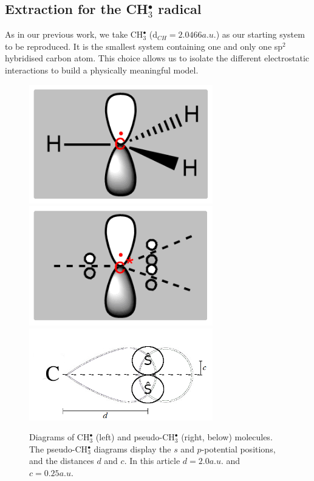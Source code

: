 \documentclass[aip]{revtex4-1}
\begin{document}
\subsection{Extraction for the CH$_3^\bullet$ radical}
\label{section:potential_derivation}
As in our previous work\cite{drujon_pseudopotentials_2013},
we take CH\(^{\bullet}_{3}\) (d$_{CH}=2.0466 a.u.$) as our starting system to be reproduced.
It is the smallest system containing one and only one sp$^2$ hybridised carbon atom.
This choice allows us to isolate the different electrostatic interactions
to build a physically meaningful model.

\begin{figure}
\begin{center}
\includegraphics[width=8cm]{ch3.png}
\includegraphics[width=8cm]{pseudoch3.png}
\includegraphics[width=8cm]{tm_sp2_potentials.png}
\end{center}
\caption{Diagrams of CH\(^{\bullet}_{3}\) (left) and pseudo-CH\(^{\bullet}_{3}\)
(right, below) molecules.
The pseudo-CH\(^{\bullet}_{3}\) diagrams display the \(s\) and \(p\)-potential positions,
and the distances \(d\) and \(c\).
In this article $d=2.0 a.u.$ and $c=0.25 a.u.$}
\label{figure:ref_pseudo_diagram}
\end{figure}
\end{document}

